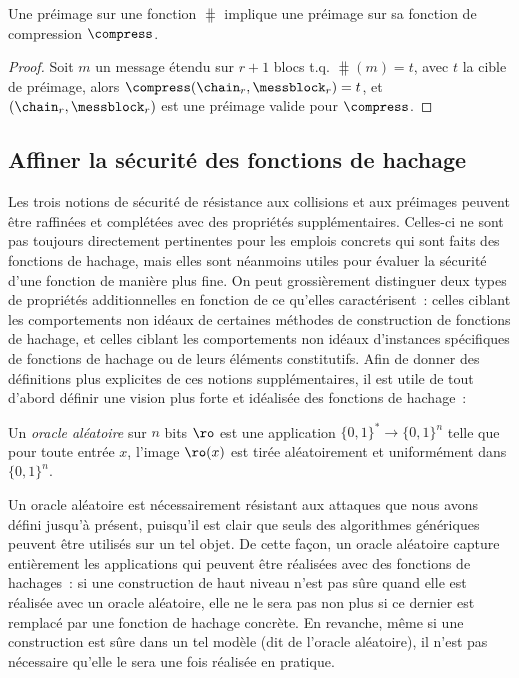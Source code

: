 \begin{prop}
Une préimage sur une fonction \merkdam $\hash$ implique une préimage sur sa fonction de compression
$\compress$.
\end{prop}
\begin{proof}
Soit 
$m$ un message étendu sur  $r+1$ blocs t.q. $\hash(m) = t$, avec $t$ la cible de préimage, alors
$\compress(\chain_r, \messblock_r) = t$, et $(\chain_r, \messblock_r)$ est une préimage valide pour $\compress$.
\end{proof}

\subsection{Affiner la sécurité des fonctions de hachage\label{sec:frefmd}}

Les trois notions de sécurité de résistance aux collisions et aux préimages peuvent être raffinées et complétées avec des propriétés supplémentaires.
Celles-ci ne sont pas toujours directement pertinentes pour les emplois concrets qui sont faits des fonctions de hachage, mais elles sont néanmoins
utiles pour évaluer la sécurité d'une fonction de manière plus fine.
On peut grossièrement distinguer deux types de propriétés additionnelles en fonction de ce qu'elles caractérisent~: celles ciblant les comportements
non idéaux de certaines méthodes de construction de fonctions de hachage, et celles ciblant les comportements
non idéaux d'instances spécifiques de fonctions de hachage ou de leurs éléments constitutifs.
Afin de donner des définitions plus explicites de ces notions supplémentaires, il est utile de tout d'abord définir une vision plus forte et idéalisée des
fonctions de hachage~: 

\begin{fdefi}
Un \emph{oracle aléatoire} sur $n$ bits
$\ro$ est une application $\{0,1\}^* \rightarrow \{0,1\}^n$ telle que pour toute entrée $x$,
l'image $\ro(x)$ est tirée aléatoirement et uniformément dans $\{0,1\}^n$.
\end{fdefi}

Un oracle aléatoire est nécessairement résistant aux attaques que nous avons défini jusqu'à présent, puisqu'il est clair
que seuls des algorithmes génériques peuvent être utilisés sur un tel objet. De cette façon, un oracle aléatoire capture
entièrement les applications qui peuvent être réalisées avec des fonctions de hachages~: si une construction de haut niveau
n'est pas sûre quand elle est réalisée avec un oracle aléatoire, elle ne le sera pas non plus si ce dernier est remplacé par une fonction
de hachage concrète. En revanche, même si une construction est sûre dans un tel modèle (dit de l'oracle aléatoire), il n'est pas
nécessaire qu'elle le sera une fois réalisée en pratique.


